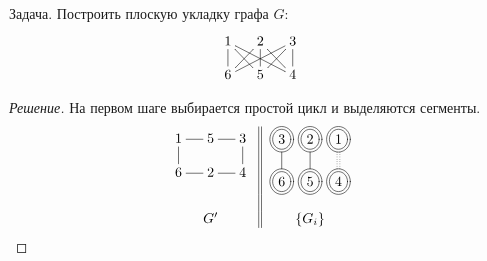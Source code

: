 \begin{exampl} Задача.
    Построить плоскую укладку графа $G$:
    \[
        {\xymatrix@=12pt{
            1 \ar@{-}[d] \ar@{-}[dr] \ar@{-}[drr]
                &2 \ar@{-}[dl] \ar@{-}[d] \ar@{-}[dr]
                    &3 \ar@{-}[dll] \ar@{-}[dl] \ar@{-}[d]
                        \\
            6
                &5
                    &4
        }}
    \]
\end{exampl}
\begin{proof}[Решение]
    На первом шаге выбирается простой цикл и выделяются сегменты.
    \[
        \begin{tabular}{c||c}
            {\xymatrix@=12pt{
                1 \ar@{-}[d] \ar@{-}[r]
                    &5 \ar@{-}[r]
                        &3 \ar@{-}[d]
                            \\
                6
                    &2 \ar@{-}[l]
                        &4 \ar@{-}[l]
            }}
            &
                {\xymatrix@=12pt{
                    *++[o][F=]{3} \ar@{-}[d]
                        \\
                    *++[o][F=]{6}
                }}
                {\xymatrix@=12pt{
                    *++[o][F=]{2} \ar@{-}[d]
                        \\
                    *++[o][F=]{5}
                }}
                {\xymatrix@=12pt{
                    *++[o][F=]{1}\ar@{:}[d]
                        \\
                    *++[o][F=]{4}
                }}
                    \\
            &\\
            $G'$&$\{G_i\}$
        \end{tabular}
    \]
    

\end{proof}

